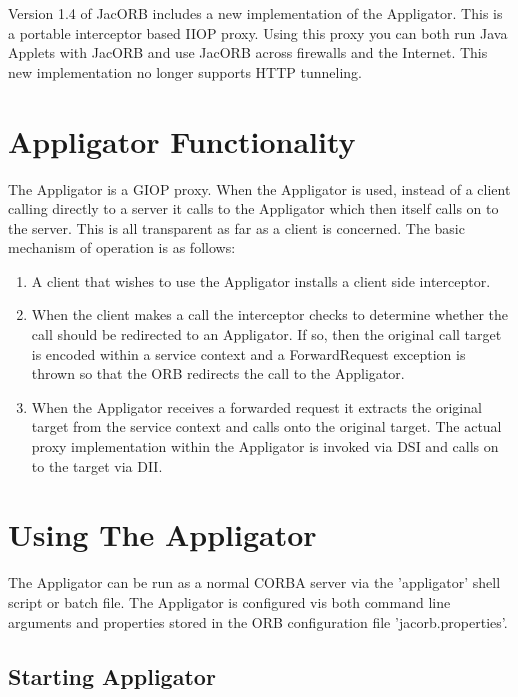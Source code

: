 \documentclass[12pt]{scrbook}
\begin{document}
\bigskip

Version 1.4 of JacORB includes a new implementation of the Appligator.
This is a portable interceptor based IIOP proxy.  Using this proxy you
can both run Java Applets with JacORB and use JacORB across firewalls
and the Internet. This new implementation no longer supports HTTP
tunneling.

\section{Appligator Functionality}

The Appligator is a GIOP proxy. When the Appligator is used, instead
of a client calling directly to a server it calls to the Appligator
which then itself calls on to the server. This is all transparent as
far as a client is concerned.  The basic mechanism of operation is as
follows:

\begin{enumerate}
\item A client that wishes to use the Appligator installs a client
  side interceptor.
\item When the client makes a call the interceptor checks to determine
  whether the call should be redirected to an Appligator. If so, then
  the original call target is encoded within a service context and a
  ForwardRequest exception is thrown so that the ORB redirects the
  call to the Appligator.
\item When the Appligator receives a forwarded request it extracts the
  original target from the service context and calls onto the original
  target. The actual proxy implementation within the Appligator is
  invoked via DSI and calls on to the target via DII.
\end{enumerate}

\section{Using The Appligator}

The Appligator can be run as a normal CORBA server via the
'appligator' shell script or batch file. The Appligator is configured
vis both command line arguments and properties stored in the ORB
configuration file 'jacorb.properties'.  

\subsection{Starting Appligator}
\end{document}
